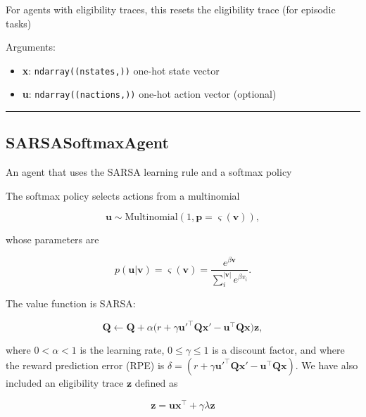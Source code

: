 For agents with eligibility traces, this resets the eligibility trace
(for episodic tasks)

Arguments:

\begin{itemize}
\tightlist
\item
  \textbf{x}: \texttt{ndarray((nstates,))} one-hot state vector
\item
  \textbf{u}: \texttt{ndarray((nactions,))} one-hot action vector
  (optional)
\end{itemize}

\begin{center}\rule{0.5\linewidth}{\linethickness}\end{center}

\subsection{SARSASoftmaxAgent}\label{sarsasoftmaxagent}

\begin{Shaded}
\begin{Highlighting}[]
\end{Highlighting}
\end{Shaded}

An agent that uses the SARSA learning rule and a softmax policy

The softmax policy selects actions from a multinomial

\[
\mathbf u \sim \mathrm{Multinomial}(1, \mathbf p=\varsigma(\mathbf v)),
\]

whose parameters are

\[
p(\mathbf u|\mathbf v) = \varsigma(\mathbf v) = \frac{e^{\beta \mathbf v}}{\sum_{i}^{|\mathbf v|} e^{\beta v_i}}.
\]

The value function is SARSA:

\[
\mathbf Q \gets \mathbf Q + \alpha \big(r + \gamma \mathbf u'^\top \mathbf Q \mathbf x' - \mathbf u^\top \mathbf Q \mathbf x \big) \mathbf z,
\]

where \(0 < \alpha < 1\) is the learning rate, \(0 \leq \gamma \leq 1\)
is a discount factor, and where the reward prediction error (RPE) is
\(\delta = (r + \gamma \mathbf u'^\top \mathbf Q \mathbf x' - \mathbf u^\top \mathbf Q \mathbf x)\).
We have also included an eligibility trace \(\mathbf z\) defined as

\[
\mathbf z = \mathbf u \mathbf x^\top +  \gamma \lambda \mathbf z
\]

